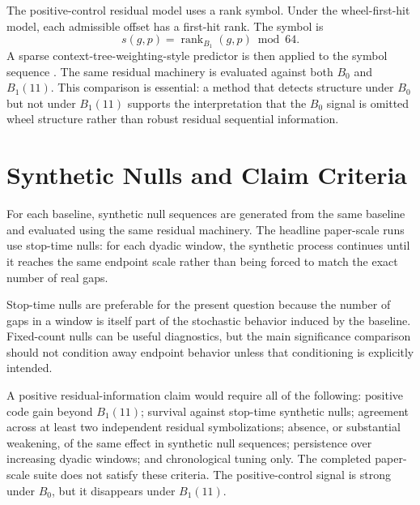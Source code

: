 \documentclass[11pt]{article}
\begin{document}
The positive-control residual model uses a rank symbol. Under the wheel-first-hit model, each admissible offset has a first-hit rank. The symbol is
\[
s(g,p)=\operatorname{rank}_{B_1}(g,p)\bmod 64.
\]
A sparse context-tree-weighting-style predictor is then applied to the symbol sequence \citep{willems1995}. The same residual machinery is evaluated against both $B_0$ and $B_1(11)$. This comparison is essential: a method that detects structure under $B_0$ but not under $B_1(11)$ supports the interpretation that the $B_0$ signal is omitted wheel structure rather than robust residual sequential information.

\section{Synthetic Nulls and Claim Criteria}

For each baseline, synthetic null sequences are generated from the same baseline and evaluated using the same residual machinery. The headline paper-scale runs use stop-time nulls: for each dyadic window, the synthetic process continues until it reaches the same endpoint scale rather than being forced to match the exact number of real gaps.

Stop-time nulls are preferable for the present question because the number of gaps in a window is itself part of the stochastic behavior induced by the baseline. Fixed-count nulls can be useful diagnostics, but the main significance comparison should not condition away endpoint behavior unless that conditioning is explicitly intended.

A positive residual-information claim would require all of the following: positive code gain beyond $B_1(11)$; survival against stop-time synthetic nulls; agreement across at least two independent residual symbolizations; absence, or substantial weakening, of the same effect in synthetic null sequences; persistence over increasing dyadic windows; and chronological tuning only. The completed paper-scale suite does not satisfy these criteria. The positive-control signal is strong under $B_0$, but it disappears under $B_1(11)$.
\end{document}
